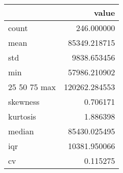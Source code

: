 \begin{tabular}{lr}
\toprule
 & value \\
\midrule
count & 246.000000 \\
mean & 85349.218715 \\
std & 9838.653456 \\
min & 57986.210902 \\
25%
50%
75%
max & 120262.284553 \\
skewness & 0.706171 \\
kurtosis & 1.886398 \\
median & 85430.025495 \\
iqr & 10381.950066 \\
cv & 0.115275 \\
\bottomrule
\end{tabular}
